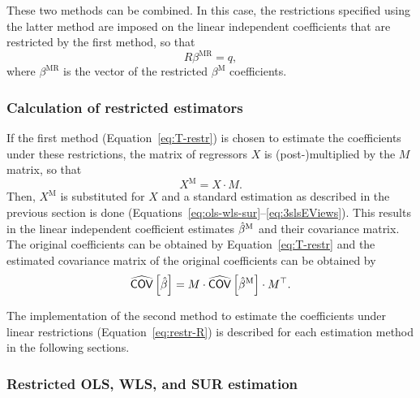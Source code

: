 These two methods can be combined.
In this case, the restrictions specified using the latter method are
imposed on the linear independent coefficients
that are restricted by the first method, so that
\begin{equation}
   R \beta^\text{MR} = q ,
\end{equation}
where $\beta^\text{MR}$ is the vector of the restricted $\beta^\text{M}$ coefficients.


\subsubsection{Calculation of restricted estimators}

If the first method (Equation~\ref{eq:T-restr}) is chosen
to estimate the coefficients under these restrictions,
the matrix of regressors $X$ is (post-)\hspace{0pt}multiplied
by the $M$ matrix,
so that
\begin{equation}
    X^\text{M} = X \cdot M .
\end{equation}
Then, $X^\text{M}$ is substituted for $X$ and a standard estimation as described
in the previous section is done
(Equations~\ref{eq:ols-wls-sur}--\ref{eq:3slsEViews}).
This results in the linear independent coefficient estimates $\hat{\beta}^\text{M}$ and
their covariance matrix.
The original coefficients can be obtained by Equation~\ref{eq:T-restr}
and the estimated covariance matrix of the original coefficients
can be obtained by
\begin{equation}
   \widehat{\mathsf{COV}} \left[ \hat{\beta} \right]
   = M \cdot \widehat{\mathsf{COV}} \left[ \hat{\beta}^\text{M} \right] \cdot M^\top .
\end{equation}

The implementation of the second method to estimate the coefficients
under linear restrictions (Equation~\ref{eq:restr-R})
is described for each estimation method in the following sections.


\subsubsection{Restricted OLS, WLS, and SUR estimation}

